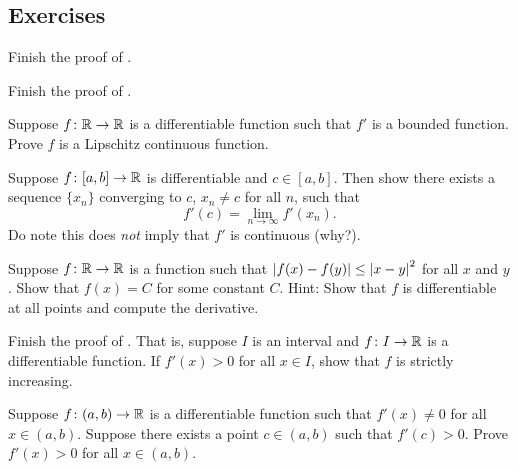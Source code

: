 \subsection{Exercises}

\begin{exercise}
Finish the proof of .
\end{exercise}

\begin{exercise}
Finish the proof of .
\end{exercise}

\begin{exercise} \label{exercise:boundeddermeanslip}
Suppose $f \colon {\mathbb{R}} \to {\mathbb{R}}$ is a differentiable
function such that $f'$ is a bounded function.  Prove
$f$ is a Lipschitz continuous function.
\end{exercise}

\pagebreak[1]
\begin{exercise}
Suppose $f \colon [a,b] \to {\mathbb{R}}$ is differentiable and $c \in [a,b]$.
Then show there exists a sequence $\{ x_n \}$ converging to $c$, $x_n
\not= c$ for all $n$, such that
\begin{equation*}
f'(c) = \lim_{n\to \infty} f'(x_n).
\end{equation*}
Do note this does \emph{not} imply that $f'$ is continuous (why?).
\end{exercise}

\pagebreak[1]
\begin{exercise}
Suppose $f \colon {\mathbb{R}} \to {\mathbb{R}}$ is a function such that
$\left\lvert {f(x)-f(y)} \right\rvert \leq \left\lvert {x-y} \right\rvert^2$ for all $x$ and $y$.  Show that
$f(x) = C$ for some constant $C$.  Hint: Show that $f$ is differentiable
at all points and compute the derivative.
\end{exercise}

\begin{exercise} \label{exercise:posderincr}
Finish the proof of .  That is,
suppose $I$ is an interval and
$f \colon I \to {\mathbb{R}}$ is a differentiable function.
If $f'(x) > 0$ for all $x \in I$, show that $f$ is strictly increasing.
\end{exercise}

\begin{exercise}
Suppose $f \colon (a,b) \to {\mathbb{R}}$ is a differentiable function
such that
$f'(x) \not= 0$ for all $x \in (a,b)$.  Suppose there
exists
a point $c \in (a,b)$ such that $f'(c) > 0$.
Prove $f'(x) > 0$ for all $x \in (a,b)$.
\end{exercise}


